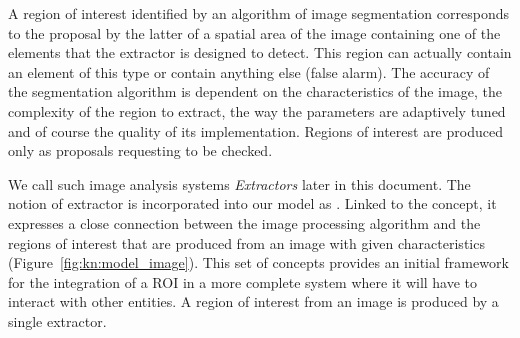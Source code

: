 

A region of interest identified by an algorithm of image segmentation corresponds to the proposal by the latter of a spatial area of the image containing one of the elements that the extractor is designed to detect.
This region can actually contain an element of this type or contain anything else (false alarm).
The accuracy of the segmentation algorithm is dependent on the characteristics of the image, the complexity of the region to extract, the way the parameters are adaptively tuned and of course the quality of its implementation.
Regions of interest are produced only as proposals requesting to be checked.

We call such image analysis systems \textit{Extractors} later in this document.
The notion of extractor is incorporated into our model as .
Linked to the  concept, it expresses a close connection between the image processing algorithm and the regions of interest that are produced from an image with given characteristics (Figure~\ref{fig:kn:model_image}).
This set of concepts provides an initial framework for the integration of a ROI in a more complete system where it will have to interact with other entities.
A region of interest from an image is produced by a single extractor.

